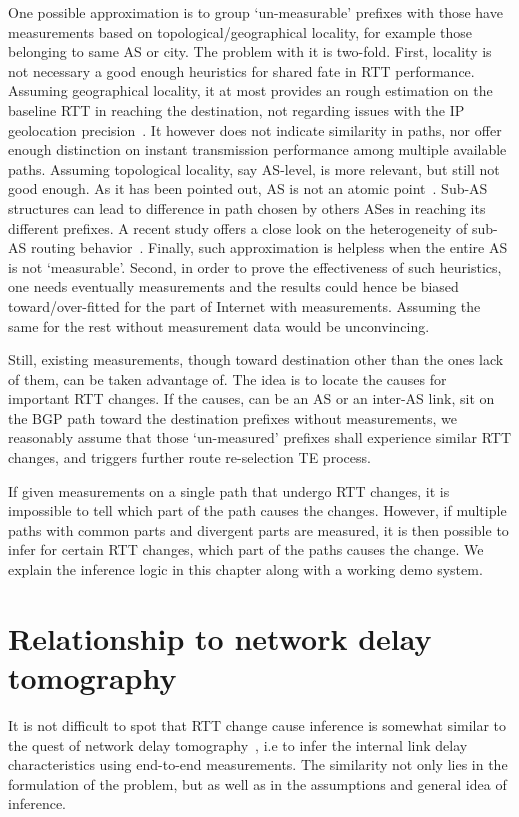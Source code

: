 One possible approximation is to group `un-measurable' prefixes with those have measurements based on topological/geographical locality, for example those belonging to same AS or city. The problem with it is two-fold. First, locality is not necessary a good enough heuristics for shared fate in RTT performance. 
Assuming geographical locality, it at most provides an rough estimation on the baseline RTT in reaching the destination, not regarding issues with the IP geolocation precision~\cite{Poese2011}. It however does not indicate similarity in paths, nor offer enough distinction on instant transmission performance among multiple available paths.
Assuming topological locality, say AS-level, is more relevant, but still not good enough.
As it has been pointed out, AS is not an atomic point~\cite{Muhlbauer2006}. Sub-AS structures can lead to difference in path chosen by others ASes in reaching its different prefixes. A recent study offers a close look on the heterogeneity of sub-AS routing behavior~\cite{Lee2016}. Finally, such approximation is helpless when the entire AS is not `measurable'.
Second, in order to prove the effectiveness of such heuristics, one needs eventually measurements and the results could hence be biased toward/over-fitted for the part of Internet with measurements. Assuming the same for the rest without measurement data would be unconvincing.

Still, existing measurements, though toward destination other than the ones lack of them, can be taken advantage of. The idea is to locate the causes for important RTT changes. If the causes, can be an AS or an inter-AS link, sit on the BGP path toward the destination prefixes without measurements, we reasonably assume that those `un-measured' prefixes shall experience similar RTT changes, and triggers further route re-selection TE process.

If given measurements on a single path that undergo RTT changes, it is impossible to tell which part of the path causes the changes. However, if multiple paths with common parts and divergent parts are measured, it is then possible to infer for certain RTT changes, which part of the paths causes the change. We explain the inference logic in this chapter along with a working demo system.

\section{Relationship to network delay tomography}
It is not difficult to spot that RTT change cause inference is somewhat similar to the quest of network delay tomography~\cite{Coates2002}, i.e to infer the internal link delay characteristics using end-to-end measurements. The similarity not only lies in the formulation of the problem, but as well as in the assumptions and general idea of inference.

